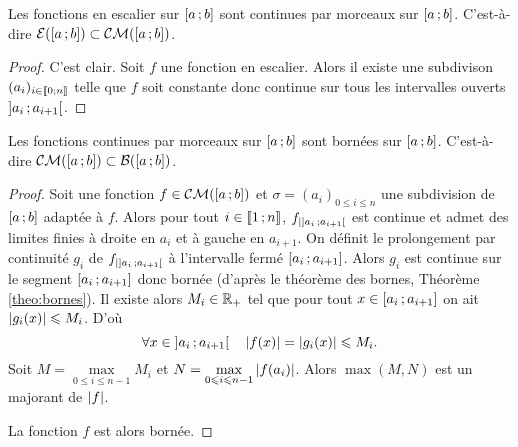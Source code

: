 \begin{prop}
  Les fonctions en escalier sur \(\left[ a \, ;  b \right]\) sont continues par morceaux sur \(\left[ a \, ;  b \right]\). C'est-à-dire \(\mathcal{E}(\left[ a \, ;  b \right]) \subset \mathcal{CM}(\left[ a \, ;  b \right])\).
\end{prop}
\begin{proof}
  C'est clair. Soit \(f\) une fonction en escalier. Alors il existe une subdivison \((a_i)_{i \in \mathopen{\llbracket}0\mathclose{}\mathpunct{};n\mathclose{\rrbracket}}\) telle que \(f\) soit constante donc continue sur tous les intervalles ouverts \(\left] a_i \, ;  a_{i+1} \right[\).
\end{proof}

\begin{prop}
  Les fonctions continues par morceaux sur \(\left[ a \, ;  b \right]\) sont bornées sur \(\left[ a \, ;  b \right]\). C'est-à-dire \(\mathcal{CM}(\left[ a \, ;  b \right]) \subset \mathcal{B}(\left[ a \, ;  b \right])\).
\end{prop}
\begin{proof}
  Soit une fonction \(f \in \mathcal{CM}(\left[ a \, ;  b \right])\) et \(\sigma=(a_i)_{0 
  \leqslant i \leqslant n}\) une subdivision de \(\left[ a \, ;  b \right]\) adaptée 
  à \(f\). Alors pour tout \(i \in \mathopen{\llbracket}1\mathclose{}\mathpunct{};n\mathclose{\rrbracket}\), 
  \(f_{|\left] a_i \, ;  a_{i+1} \right[}\) est continue et admet des limites finies 
  à droite en \(a_{i}\) et à gauche en \(a_{i+1}\). On définit le prolongement 
  par continuité \(g_i\) de \(f_{|\left] a_i \, ;  a_{i+1} \right[}\) à l'intervalle 
  fermé \(\left[ a_i \, ;  a_{i+1} \right]\). Alors \(g_i\) est continue sur le 
  segment \(\left[ a_i \, ;  a_{i+1} \right]\) donc bornée (d'après le théorème des 
  bornes, Théorème~
\ref{theo:bornes}). Il existe alors \(M_i \in \mathbb{R}_+\) tel que 
  pour tout \(x \in \left[ a_i \, ;  a_{i+1} \right] \) on ait \(\left\lvert g_i(x)\right\rvert 
  \leqslant M_i\). D'où
  \begin{equation}
    \forall x \in \left] a_i \, ;  a_{i+1} \right[ \quad \left\lvert f(x)\right\rvert=\left\lvert g_i(x)\right\rvert \leqslant M_i.
  \end{equation}
  Soit \(M=\max\limits_{0 \leqslant i \leqslant n-1} M_i\) et \(N=\max\limits_{0 \leqslant i \leqslant n-1} \left\lvert f(a_i)\right\rvert\). Alors \(\max(M,N)\) est un majorant de \(\left\lvert f\right\rvert\).

  La fonction \(f\) est alors bornée.
\end{proof}

